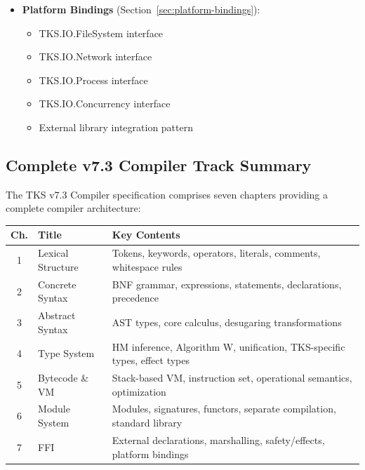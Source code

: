 \begin{tcolorbox}[colback=green!5!white,colframe=green!50!black,title=\textbf{COMPILER-TASK-07 Complete: FFI Chapter},breakable]
\begin{itemize}
    \begin{itemize}
      \item Function pointer creation from TKS functions
      \item Closure conversion for captured environments
      \item Callback lifetime management
      \item Callback registry for long-lived handlers
    \end{itemize}
  \item \textbf{Platform Bindings} (Section~\ref{sec:platform-bindings}):
    \begin{itemize}
      \item TKS.IO.FileSystem interface
      \item TKS.IO.Network interface
      \item TKS.IO.Process interface
      \item TKS.IO.Concurrency interface
      \item External library integration pattern
    \end{itemize}
\end{itemize}
\end{tcolorbox}

\subsection{Complete v7.3 Compiler Track Summary}
\label{subsec:compiler-track-summary}

The TKS v7.3 Compiler specification comprises seven chapters providing a complete compiler architecture:

\begin{center}
\begin{tabular}{clp{8cm}}
\toprule
\textbf{Ch.} & \textbf{Title} & \textbf{Key Contents} \\
\midrule
1 & Lexical Structure & Tokens, keywords, operators, literals, comments, whitespace rules \\
2 & Concrete Syntax & BNF grammar, expressions, statements, declarations, precedence \\
3 & Abstract Syntax & AST types, core calculus, desugaring transformations \\
4 & Type System & HM inference, Algorithm W, unification, TKS-specific types, effect types \\
5 & Bytecode \& VM & Stack-based VM, instruction set, operational semantics, optimization \\
6 & Module System & Modules, signatures, functors, separate compilation, standard library \\
7 & FFI & External declarations, marshalling, safety/effects, platform bindings \\
\bottomrule
\end{tabular}
\end{center}

